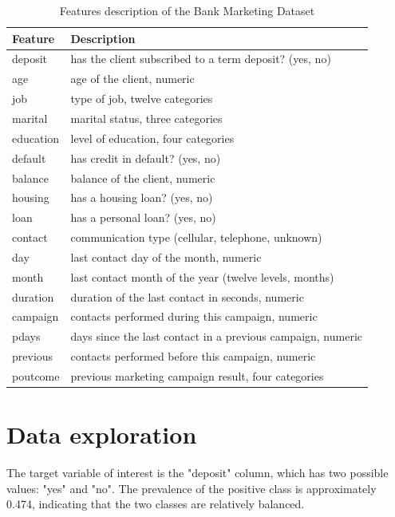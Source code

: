 \documentclass[conference]{IEEEtran}
\begin{document}
\begin{table}[htbp]
\caption{Features description of the Bank Marketing Dataset}
\label{tab1}
\begin{center}
\begin{tabular}{|l|l|}
\hline
\textbf{Feature} & \textbf{Description} \\
\hline
deposit & has the client subscribed to a term deposit? (yes, no) \\
\hline
age & age of the client, numeric \\
\hline
job & type of job, twelve categories \\
\hline
marital & marital status, three categories \\
\hline
education & level of education, four categories \\
\hline
default & has credit in default? (yes, no) \\
\hline
balance & balance of the client, numeric \\
\hline
housing & has a housing loan? (yes, no) \\
\hline
loan & has a personal loan? (yes, no) \\
\hline
contact & communication type (cellular, telephone, unknown) \\
\hline
day & last contact day of the month, numeric \\
\hline
month & last contact month of the year (twelve levels, months) \\
\hline
duration & duration of the last contact in seconds, numeric \\
\hline
campaign & contacts performed during this campaign, numeric \\
\hline
pdays & days since the last contact in a previous campaign, numeric \\
\hline
previous & contacts performed before this campaign, numeric \\
\hline
poutcome & previous marketing campaign result, four categories \\
\hline
\end{tabular}
\end{center}
\end{table}

\section{Data exploration}

The target variable of interest is the "deposit" column, which has two possible values: "yes" and "no". The prevalence of the positive class is approximately 0.474, indicating that the two classes are relatively balanced.
\end{document}
